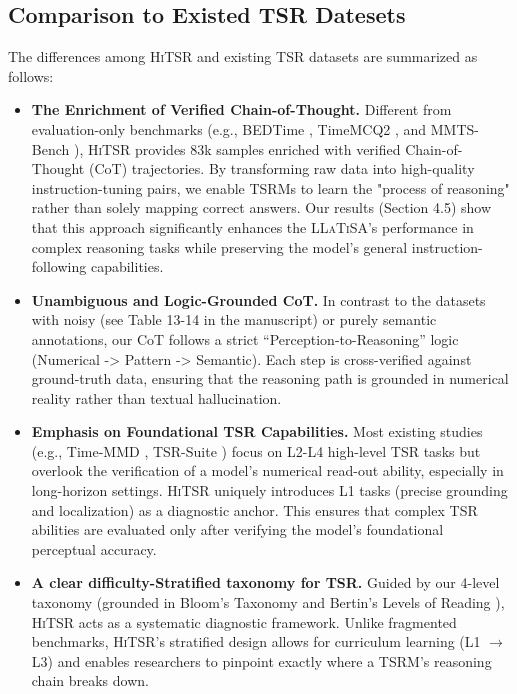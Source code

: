 \documentclass[11pt]{article}
\begin{document}
\subsection{Comparison to Existed TSR Datesets}
The differences among \textsc{HiTSR} and existing TSR datasets are summarized as follows:
\begin{itemize}[left=0pt]
\setlength{\itemsep}{0.5pt}
    \item \textbf{The Enrichment of Verified Chain-of-Thought.} Different from evaluation-only benchmarks (e.g., BEDTime \cite{bedtime}, TimeMCQ2 \cite{mcq2}, and MMTS-Bench \cite{mmtsbench}), \textsc{HiTSR} provides 83k samples enriched with verified Chain-of-Thought (CoT) trajectories. By transforming raw data into high-quality instruction-tuning pairs, we enable TSRMs to learn the "process of reasoning" rather than solely mapping correct answers. Our results (Section 4.5) show that this approach significantly enhances the \textsc{LLaTiSA}'s performance in complex reasoning tasks while preserving the model's general instruction-following capabilities.
    \item \textbf{Unambiguous and Logic-Grounded CoT.} In contrast to the datasets with noisy (see Table 13-14 in the manuscript) or purely semantic annotations, our CoT follows a strict ``Perception-to-Reasoning'' logic (Numerical -> Pattern -> Semantic). Each step is cross-verified against ground-truth data, ensuring that the reasoning path is grounded in numerical reality rather than textual hallucination.
    \item \textbf{Emphasis on Foundational TSR Capabilities.} Most existing studies (e.g., Time-MMD \cite{timemmd}, TSR-Suite \cite{timeomni}) focus on L2-L4 high-level TSR tasks but overlook the verification of a model's numerical read-out ability, especially in long-horizon settings. \textsc{HiTSR} uniquely introduces L1 tasks (precise grounding and localization) as a diagnostic anchor. This ensures that complex TSR abilities are evaluated only after verifying the model's foundational perceptual accuracy.
    \item \textbf{A clear difficulty-Stratified taxonomy for TSR.} Guided by our 4-level taxonomy (grounded in Bloom's Taxonomy \cite{bloom} and Bertin's Levels of Reading \cite{Bertin}), \textsc{HiTSR} acts as a systematic diagnostic framework. Unlike fragmented benchmarks, \textsc{HiTSR}'s stratified design allows for curriculum learning (L1 $\rightarrow$ L3) and enables researchers to pinpoint exactly where a TSRM’s reasoning chain breaks down.
\end{itemize}
\end{document}
